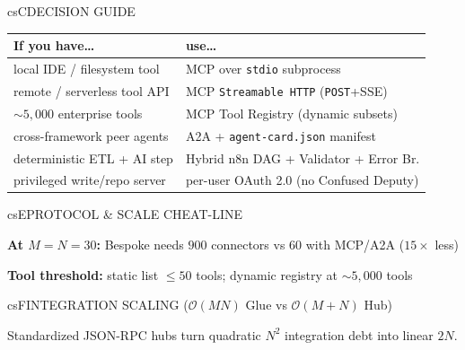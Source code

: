 \documentclass[../../../../master.tex]{subfiles}
\begin{document}
\begin{cscolumns}
\begin{cscard}{csC}{DECISION GUIDE}
  \renewcommand{\arraystretch}{1.16}\small
  \begin{tabular}{@{}>{\raggedright\arraybackslash}p{3.0cm}>{\raggedright\arraybackslash}p{4.7cm}@{}}
    \textbf{If you have\ldots} & \textbf{use\ldots}\\ \hline
    local IDE / filesystem tool & MCP over \texttt{stdio} subprocess\\
    remote / serverless tool API & MCP \texttt{Streamable HTTP} (\texttt{POST}+SSE)\\
    $\sim 5{,}000$ enterprise tools & MCP Tool Registry (dynamic subsets)\\
    cross-framework peer agents & A2A + \texttt{agent-card.json} manifest\\
    deterministic ETL + AI step & Hybrid n8n DAG + Validator + Error Br.\\
    privileged write/repo server & per-user OAuth 2.0 (no Confused Deputy)\\
  \end{tabular}
\end{cscard}

\begin{cscard}{csE}{PROTOCOL \& SCALE CHEAT-LINE}
  \begin{csbul}
    \item \textbf{At $M{=}N{=}30$:} Bespoke needs $900$ connectors vs $60$ with MCP/A2A ($15\times$ less)
    \item \textbf{Tool threshold:} static list $\le 50$ tools; dynamic registry at $\sim 5{,}000$ tools
  \end{csbul}
\end{cscard}

\begin{cscard}{csF}{INTEGRATION SCALING ($\mathcal{O}(MN)$ Glue vs $\mathcal{O}(M+N)$ Hub)}
  \centering
  \par
  {\scriptsize Standardized JSON-RPC hubs turn quadratic $N^2$ integration debt into linear $2N$.}
\end{cscard}
\columnbreak


\end{cscolumns}
\end{document}

